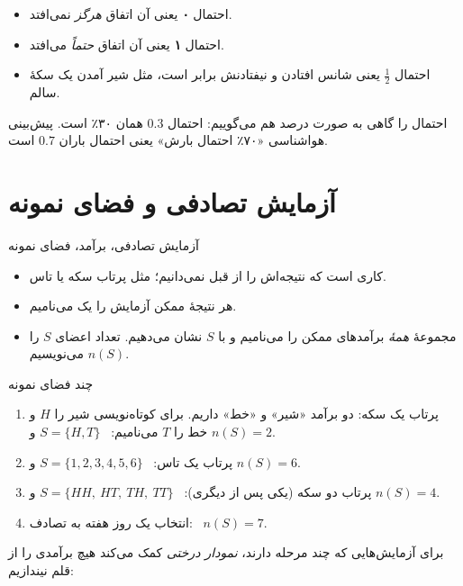 \begin{itemize}
  \item احتمال \textbf{۰} یعنی آن اتفاق \emph{هرگز} نمی‌افتد.
  \item احتمال \textbf{۱} یعنی آن اتفاق \emph{حتماً} می‌افتد.
  \item احتمال $\tfrac12$ یعنی شانس افتادن و نیفتادنش برابر است، مثل شیر آمدن یک سکهٔ سالم.
\end{itemize}

احتمال را گاهی به صورت درصد هم می‌گوییم: احتمال $0.3$ همان ۳۰٪ است. پیش‌بینی هواشناسی «۷۰٪ احتمال بارش» یعنی احتمال باران $0.7$ است.

\section{آزمایش تصادفی و فضای نمونه}

\begin{definition}[label=hs:def:experiment]{آزمایش تصادفی، برآمد، فضای نمونه}
\begin{itemize}
  \item {} کاری است که نتیجه‌اش را از قبل نمی‌دانیم؛ مثل پرتاب سکه یا تاس.
  \item هر نتیجهٔ ممکن آزمایش را یک  می‌نامیم.
  \item مجموعهٔ \emph{همهٔ} برآمدهای ممکن را  می‌نامیم و با $S$ نشان می‌دهیم. تعداد اعضای $S$ را $n(S)$ می‌نویسیم.
\end{itemize}
\end{definition}

\begin{example}[label=hs:ex:spaces]{چند فضای نمونه}
\begin{enumerate}
  \item پرتاب یک سکه: دو برآمد «شیر» و «خط» داریم. برای کوتاه‌نویسی شیر را $H$ و خط را $T$ می‌نامیم: \ $S=\{H,T\}$ و $n(S)=2$.
  \item پرتاب یک تاس: \ $S=\{1,2,3,4,5,6\}$ و $n(S)=6$.
  \item پرتاب دو سکه (یکی پس از دیگری): \ $S=\{HH,\ HT,\ TH,\ TT\}$ و $n(S)=4$.
  \item انتخاب یک روز هفته به تصادف: \ $n(S)=7$.
\end{enumerate}
\end{example}

برای آزمایش‌هایی که چند مرحله دارند، \emph{نمودار درختی} کمک می‌کند هیچ برآمدی را از قلم نیندازیم:

